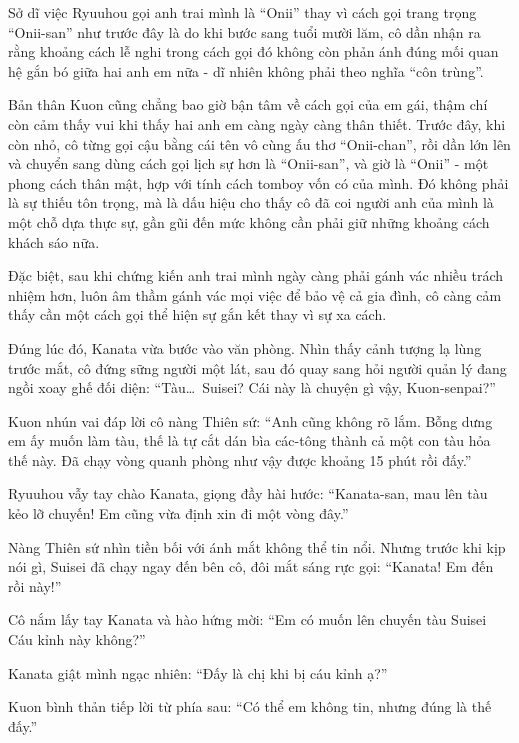 \documentclass[../main.tex]{subfiles}
\begin{document}
\chrint

Sở dĩ việc Ryuuhou gọi anh trai mình là ``Onii'' thay vì cách gọi trang trọng ``Onii-san'' như trước đây là do khi bước sang tuổi mười lăm, cô dần nhận ra rằng khoảng cách lễ nghi trong cách gọi đó không còn phản ánh đúng mối quan hệ gắn bó giữa hai anh em nữa - dĩ nhiên không phải theo nghĩa ``côn trùng''.

Bản thân Kuon cũng chẳng bao giờ bận tâm về cách gọi của em gái, thậm chí còn cảm thấy vui khi thấy hai anh em càng ngày càng thân thiết. Trước đây, khi còn nhỏ, cô từng gọi cậu bằng cái tên vô cùng ấu thơ ``Onii-chan'', rồi dần lớn lên và chuyển sang dùng cách gọi lịch sự hơn là ``Onii-san'', và giờ là ``Onii'' - một phong cách thân mật, hợp với tính cách tomboy vốn có của mình. Đó không phải là sự thiếu tôn trọng, mà là dấu hiệu cho thấy cô đã coi người anh của mình là một chỗ dựa thực sự, gần gũi đến mức không cần phải giữ những khoảng cách khách sáo nữa.

Đặc biệt, sau khi chứng kiến anh trai mình ngày càng phải gánh vác nhiều trách nhiệm hơn, luôn âm thầm gánh vác mọi việc để bảo vệ cả gia đình, cô càng cảm thấy cần một cách gọi thể hiện sự gắn kết thay vì sự xa cách.

\chrint

Đúng lúc đó, Kanata vừa bước vào văn phòng. Nhìn thấy cảnh tượng lạ lùng trước mắt, cô đứng sững người một lát, sau đó quay sang hỏi người quản lý đang ngồi xoay ghế đối diện: ``Tàu\dots\ Suisei? Cái này là chuyện gì vậy, Kuon-senpai?''


Kuon nhún vai đáp lời cô nàng Thiên sứ: ``Anh cũng không rõ lắm. Bỗng dưng em ấy muốn làm tàu, thế là tự cắt dán bìa các-tông thành cả một con tàu hỏa thế này. Đã chạy vòng quanh phòng như vậy được khoảng 15 phút rồi đấy.''

Ryuuhou vẫy tay chào Kanata, giọng đầy hài hước: ``Kanata-san, mau lên tàu kẻo lỡ chuyến! Em cũng vừa định xin đi một vòng đây.''

Nàng Thiên sứ nhìn tiền bối với ánh mắt không thể tin nổi. Nhưng trước khi kịp nói gì, Suisei đã chạy ngay đến bên cô, đôi mắt sáng rực gọi: ``Kanata! Em đến rồi này!''

Cô nắm lấy tay Kanata và hào hứng mời: ``Em có muốn lên chuyến tàu Suisei Cáu kỉnh này không?''

Kanata giật mình ngạc nhiên: ``Đấy là chị khi bị cáu kỉnh ạ?''

Kuon bình thản tiếp lời từ phía sau: ``Có thể em không tin, nhưng đúng là thế đấy.''
\end{document}
